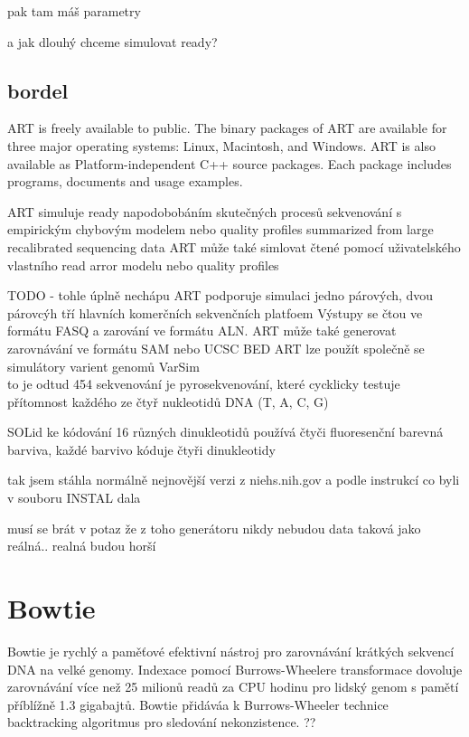 \documentclass[czech,DP]{thesiskiv}
\begin{document}
pak tam máš parametry 

a jak dlouhý chceme simulovat ready? 



\subsection{bordel}
ART is freely available to public. The binary packages of ART are available for three major operating systems: Linux, Macintosh, and Windows. ART is also available as Platform-independent C++ source packages. Each package includes programs, documents and usage examples.

ART simuluje ready napodobobáním skutečných procesů sekvenování s empirickým chybovým modelem nebo quality profiles summarized from large recalibrated sequencing data
ART může také simlovat čtené pomocí uživatelského vlastního read arror modelu nebo quality profiles

TODO - tohle úplně nechápu ART podporuje simulaci jedno párových, dvou párovcýh tří hlavních komerčních sekvenčních platfoem 
Výstupy se čtou ve formátu FASQ a zarování ve formátu ALN. 
ART může také generovat zarovnávání ve formátu SAM nebo UCSC BED
ART lze použít společně se simulátory varient genomů VarSim 
\\
to je odtud %
454 sekvenování je pyrosekvenování, které cycklicky testuje přítomnost každého ze čtyř nukleotidů DNA (T, A, C, G)

SOLid ke kódování 16 různých dinukleotidů používá čtyči fluoresenční barevná barviva, každé barvivo kóduje čtyři dinukleotidy
 


tak jsem stáhla normálně nejnovější verzi z niehs.nih.gov a podle instrukcí co byli v souboru INSTAL dala %


musí se brát v potaz že z toho generátoru nikdy nebudou data taková jako reálná.. realná budou horší 




\section{Bowtie}
Bowtie je rychlý a paměťové efektivní nástroj pro zarovnávání krátkých sekvencí DNA na velké genomy. Indexace pomocí Burrows-Wheelere transformace dovoluje zarovnávání více než 25 milionů readů za CPU hodinu pro lidský genom s pamětí příblížně 1.3 gigabajtů. Bowtie přidáváa k Burrows-Wheeler technice backtracking algoritmus pro sledování nekonzistence. ??
\end{document}
